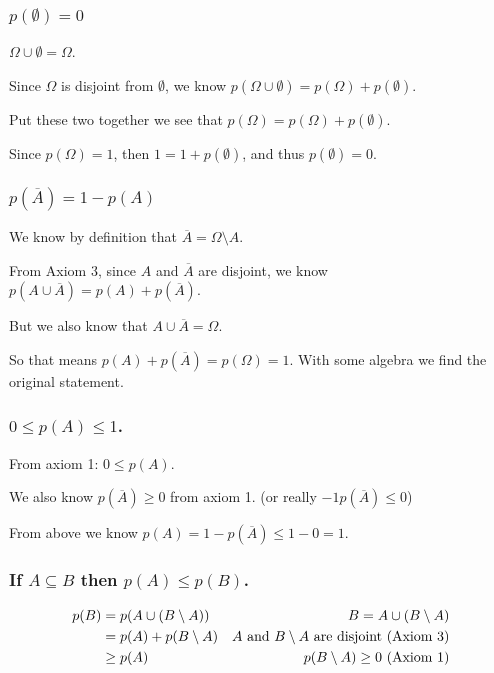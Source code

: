 \subsubsection{$p(\emptyset) = 0$}
$\Omega \cup \emptyset = \Omega$. 

Since $\Omega$ is disjoint from $\emptyset$, 
we know $p(\Omega\cup\emptyset) = p(\Omega) + p(\emptyset)$. 

Put these two together we see that 
$p(\Omega) = p(\Omega) + p(\emptyset)$. 

Since $p(\Omega)=1$, 
then $1 = 1 + p(\emptyset)$, 
and thus $p(\emptyset) = 0$. 

\subsubsection{$p(\overline{A}) = 1-p(A)$}
We know by definition that $\overline{A} = \Omega \setminus A$. 

From Axiom 3, since $A$ and $\overline{A}$ are disjoint, 
we know $p(A\cup\overline{A}) = p(A) + p(\overline{A})$.

But we also know that $A\cup\overline{A} = \Omega$. 

So that means $ p(A) + p(\overline{A}) = p(\Omega) = 1$. 
With some algebra we find the original statement. 

\subsubsection{$0 \le p(A) \le 1$.}

From axiom 1: $0 \le p(A)$. 

We also know $p(\overline{A})\ge 0$ from axiom 1. (or really  $-1 p(\overline{A})\le 0$)

From above we know $p(A) = 1-p(\overline{A}) \le 1-0 = 1$.

\subsubsection{If $A\subseteq B$ then $p(A) \le p(B)$.}

\begin{align*}
p(B) & = p(A \cup (B\setminus A)) &			B = A \cup (B\setminus A)\\
	&= p(A) + p(B\setminus A) & A \textnormal{ and } B\setminus A \textnormal{ are disjoint (Axiom 3)} \\
	&\ge p(A) 				& p(B\setminus A) \ge 0 \textnormal{ (Axiom 1)} \\
\end{align*}

